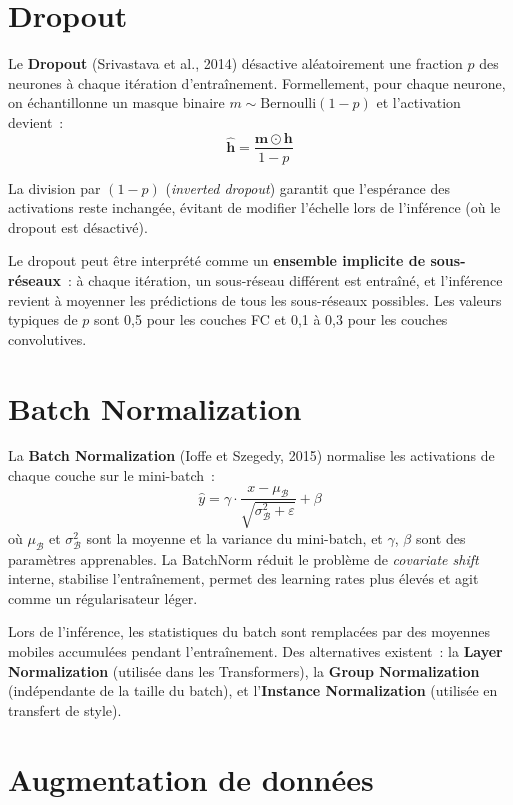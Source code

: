 \documentclass[a4paper,11pt,twoside]{book}
\newcommand{\vect}[1]{\boldsymbol{#1}}
\begin{document}
\section{Dropout}

Le \textbf{Dropout} (Srivastava et al., 2014) désactive aléatoirement une fraction $p$ des neurones à chaque itération d'entraînement. Formellement, pour chaque neurone, on échantillonne un masque binaire $m \sim \text{Bernoulli}(1-p)$ et l'activation devient~:
\[
\hat{\vect{h}} = \frac{\vect{m} \odot \vect{h}}{1-p}
\]

La division par $(1-p)$ (\textit{inverted dropout}) garantit que l'espérance des activations reste inchangée, évitant de modifier l'échelle lors de l'inférence (où le dropout est désactivé).

Le dropout peut être interprété comme un \textbf{ensemble implicite de sous-réseaux}~: à chaque itération, un sous-réseau différent est entraîné, et l'inférence revient à moyenner les prédictions de tous les sous-réseaux possibles. Les valeurs typiques de $p$ sont 0,5 pour les couches FC et 0,1 à 0,3 pour les couches convolutives.

\section{Batch Normalization}

La \textbf{Batch Normalization} (Ioffe et Szegedy, 2015) normalise les activations de chaque couche sur le mini-batch~:
\[
\hat{y} = \gamma \cdot \frac{x - \mu_{\mathcal{B}}}{\sqrt{\sigma_{\mathcal{B}}^2 + \varepsilon}} + \beta
\]
où $\mu_{\mathcal{B}}$ et $\sigma_{\mathcal{B}}^2$ sont la moyenne et la variance du mini-batch, et $\gamma$, $\beta$ sont des paramètres apprenables. La BatchNorm réduit le problème de \textit{covariate shift} interne, stabilise l'entraînement, permet des learning rates plus élevés et agit comme un régularisateur léger.

Lors de l'inférence, les statistiques du batch sont remplacées par des moyennes mobiles accumulées pendant l'entraînement. Des alternatives existent~: la \textbf{Layer Normalization} (utilisée dans les Transformers), la \textbf{Group Normalization} (indépendante de la taille du batch), et l'\textbf{Instance Normalization} (utilisée en transfert de style).

\section{Augmentation de données}
\end{document}
